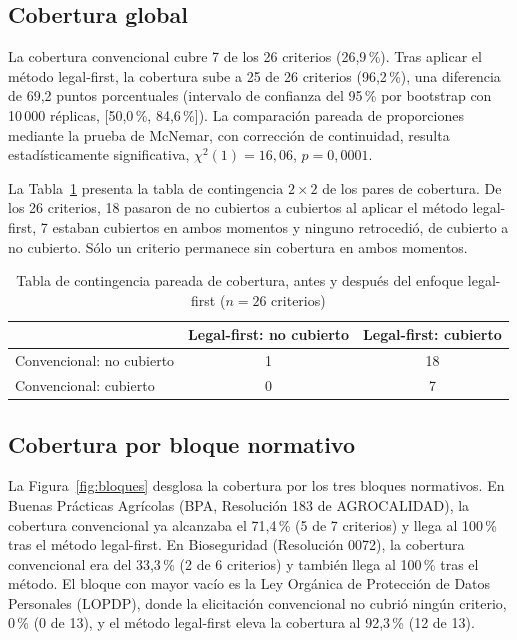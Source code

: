 \documentclass[pdflatex,sn-mathphys-num]{sn-jnl}
\begin{document}
\subsection{Cobertura global}

La cobertura convencional cubre 7 de los 26 criterios (26,9\,\%). Tras aplicar el m\'etodo legal-first, la cobertura sube a 25 de 26 criterios (96,2\,\%), una diferencia de 69,2 puntos porcentuales (intervalo de confianza del 95\,\% por bootstrap con 10\,000 r\'eplicas, [50,0\,\%, 84,6\,\%]). La comparaci\'on pareada de proporciones mediante la prueba de McNemar, con correcci\'on de continuidad, resulta estad\'isticamente significativa, $\chi^2(1)=16,06$, $p=0,0001$.

La Tabla~\ref{tab:mcnemar} presenta la tabla de contingencia $2\times2$ de los pares de cobertura. De los 26 criterios, 18 pasaron de no cubiertos a cubiertos al aplicar el m\'etodo legal-first, 7 estaban cubiertos en ambos momentos y ninguno retrocedi\'o, de cubierto a no cubierto. S\'olo un criterio permanece sin cobertura en ambos momentos.

\begin{table}[htbp]
\caption{Tabla de contingencia pareada de cobertura, antes y despu\'es del enfoque legal-first ($n=26$ criterios)}\label{tab:mcnemar}
\begin{tabular}{@{}lcc@{}}
\toprule
 & Legal-first: no cubierto & Legal-first: cubierto \\
\midrule
Convencional: no cubierto & 1 & 18 \\
Convencional: cubierto & 0 & 7 \\
\bottomrule
\end{tabular}
\end{table}

\subsection{Cobertura por bloque normativo}

La Figura~\ref{fig:bloques} desglosa la cobertura por los tres bloques normativos. En Buenas Pr\'acticas Agr\'icolas (BPA, Resoluci\'on 183 de AGROCALIDAD), la cobertura convencional ya alcanzaba el 71,4\,\% (5 de 7 criterios) y llega al 100\,\% tras el m\'etodo legal-first. En Bioseguridad (Resoluci\'on 0072), la cobertura convencional era del 33,3\,\% (2 de 6 criterios) y tambi\'en llega al 100\,\% tras el m\'etodo. El bloque con mayor vac\'io es la Ley Org\'anica de Protecci\'on de Datos Personales (LOPDP), donde la elicitaci\'on convencional no cubri\'o ning\'un criterio, 0\,\% (0 de 13), y el m\'etodo legal-first eleva la cobertura al 92,3\,\% (12 de 13).
\end{document}

